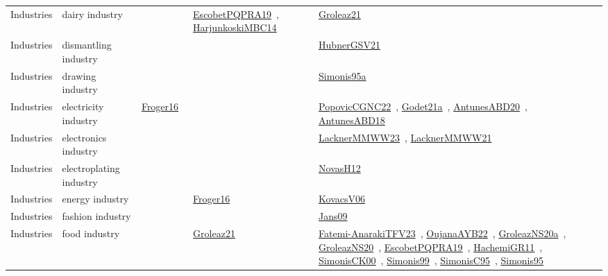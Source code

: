 {\begin{longtable}{lp{3cm}>{\raggedright\arraybackslash}p{6cm}>{\raggedright\arraybackslash}p{6cm}>{\raggedright\arraybackslash}p{8cm}}
\index{dairy industry}\index{Industries!dairy industry}Industries & dairy industry &  & \href{../works/EscobetPQPRA19.pdf}{EscobetPQPRA19}~\cite{EscobetPQPRA19}, \href{../works/HarjunkoskiMBC14.pdf}{HarjunkoskiMBC14}~\cite{HarjunkoskiMBC14} & \href{../works/Groleaz21.pdf}{Groleaz21}~\cite{Groleaz21}\\
\index{dismantling industry}\index{Industries!dismantling industry}Industries & dismantling industry &  &  & \href{../works/HubnerGSV21.pdf}{HubnerGSV21}~\cite{HubnerGSV21}\\
\index{drawing industry}\index{Industries!drawing industry}Industries & drawing industry &  &  & \href{../works/Simonis95a.pdf}{Simonis95a}~\cite{Simonis95a}\\
\index{electricity industry}\index{Industries!electricity industry}Industries & electricity industry & \href{../works/Froger16.pdf}{Froger16}~\cite{Froger16} &  & \href{../works/PopovicCGNC22.pdf}{PopovicCGNC22}~\cite{PopovicCGNC22}, \href{../works/Godet21a.pdf}{Godet21a}~\cite{Godet21a}, \href{../works/AntunesABD20.pdf}{AntunesABD20}~\cite{AntunesABD20}, \href{../works/AntunesABD18.pdf}{AntunesABD18}~\cite{AntunesABD18}\\
\index{electronics industry}\index{Industries!electronics industry}Industries & electronics industry &  &  & \href{../works/LacknerMMWW23.pdf}{LacknerMMWW23}~\cite{LacknerMMWW23}, \href{../works/LacknerMMWW21.pdf}{LacknerMMWW21}~\cite{LacknerMMWW21}\\
\index{electroplating industry}\index{Industries!electroplating industry}Industries & electroplating industry &  &  & \href{../works/NovasH12.pdf}{NovasH12}~\cite{NovasH12}\\
\index{energy industry}\index{Industries!energy industry}Industries & energy industry &  & \href{../works/Froger16.pdf}{Froger16}~\cite{Froger16} & \href{../works/KovacsV06.pdf}{KovacsV06}~\cite{KovacsV06}\\
\index{fashion industry}\index{Industries!fashion industry}Industries & fashion industry &  &  & \href{../works/Jans09.pdf}{Jans09}~\cite{Jans09}\\
\index{food industry}\index{Industries!food industry}Industries & food industry &  & \href{../works/Groleaz21.pdf}{Groleaz21}~\cite{Groleaz21} & \href{../works/Fatemi-AnarakiTFV23.pdf}{Fatemi-AnarakiTFV23}~\cite{Fatemi-AnarakiTFV23}, \href{../works/OujanaAYB22.pdf}{OujanaAYB22}~\cite{OujanaAYB22}, \href{../works/GroleazNS20a.pdf}{GroleazNS20a}~\cite{GroleazNS20a}, \href{../works/GroleazNS20.pdf}{GroleazNS20}~\cite{GroleazNS20}, \href{../works/EscobetPQPRA19.pdf}{EscobetPQPRA19}~\cite{EscobetPQPRA19}, \href{../works/HachemiGR11.pdf}{HachemiGR11}~\cite{HachemiGR11}, \href{../works/SimonisCK00.pdf}{SimonisCK00}~\cite{SimonisCK00}, \href{../works/Simonis99.pdf}{Simonis99}~\cite{Simonis99}, \href{../works/SimonisC95.pdf}{SimonisC95}~\cite{SimonisC95}, \href{../works/Simonis95.pdf}{Simonis95}~\cite{Simonis95}\\

\end{longtable}}
